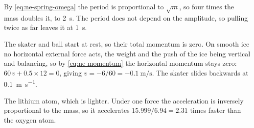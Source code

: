 By \cref{eq:ne-spring-omega} the
period is proportional to $\sqrt{m}$, so four times the mass doubles it,
to \SI{2}{\second}. The period does not depend on the amplitude, so
pulling twice as far leaves it at \SI{1}{\second}.

The skater and ball start at rest, so
their total momentum is zero. On smooth ice no horizontal external force
acts, the weight and the push of the ice being vertical and balancing,
so by \cref{eq:ne-momentum} the horizontal momentum stays zero: $60\,v +
0.5\times12 = 0$, giving $v = -6/60 = \SI{-0.1}{\metre\per\second}$. The skater slides backwards at
\SI{0.1}{\metre\per\second}.

The lithium atom, which is lighter. Under
one force the acceleration is inversely proportional to the mass, so it
accelerates $15.999/6.94 = 2.31$ times faster than the oxygen atom.
